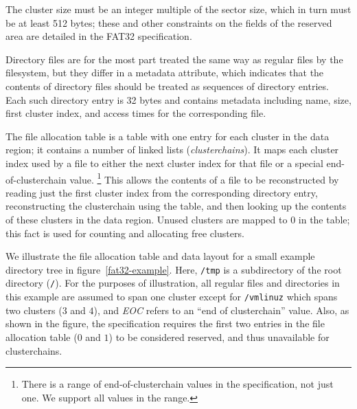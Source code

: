\documentclass[submission,copyright,creativecommons]{eptcs}
\begin{document}
The cluster size must be an integer multiple of the sector
size, which in turn must be at least 512 bytes; these and other
constraints on the fields of the reserved area are detailed in the
FAT32 specification.

Directory
files are for the most part treated the same way as regular files by
the filesystem, but they differ in a metadata attribute, which
indicates that the contents of directory files should be treated as
sequences of directory entries. Each such directory entry is
32 bytes and contains metadata including name, size, first
cluster index, and access times for the corresponding file.

The file allocation table is a table with one entry for each cluster
in the data region; it contains a number of linked lists
(\textit{clusterchains}). It
maps each cluster index used by a file to either the next cluster
index for that file or a special end-of-clusterchain value. \footnote{
There is a range of end-of-clusterchain values in the
specification, not just one. We support all values in the range.} This
allows the contents of a file to be reconstructed by
reading just the first cluster index from the corresponding directory
entry, reconstructing the clusterchain using the table, and then
looking up the contents of these clusters in the data
region. Unused clusters are mapped to 0 in the table; this fact is
used for counting and allocating free clusters.

We illustrate the file allocation table and data layout for a small
example directory tree in figure~\ref{fat32-example}. Here,
\texttt{/tmp} is a subdirectory of the root directory
(\texttt{/}). For the purposes of illustration, all regular files and
directories in this example are assumed to span one cluster except for
\texttt{/vmlinuz} which spans two clusters ($3$ and $4$), and
\textit{EOC} refers to an ``end of clusterchain'' value. Also, as
shown in the figure, the specification requires the first two entries
in the file allocation table ($0$ and $1$) to be considered reserved,
and thus unavailable for clusterchains.
\end{document}
